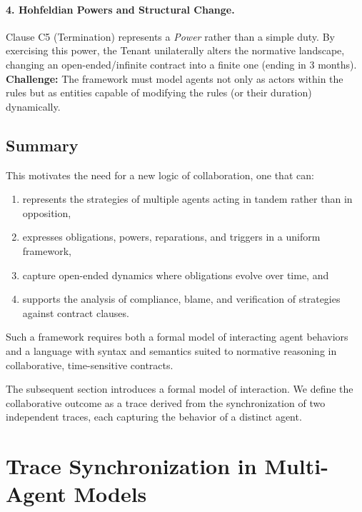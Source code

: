 \documentclass{article}
\begin{document}
    \paragraph{4. Hohfeldian Powers and Structural Change.}
    Clause C5 (Termination) represents a \emph{Power} rather than a simple duty.
    By exercising this power, the Tenant unilaterally alters the normative landscape, changing an open-ended/infinite contract into a finite one (ending in 3 months).
    \textbf{Challenge:} The framework must model agents not only as actors within the rules but as entities capable of modifying the rules (or their duration) dynamically.
    \subsection*{Summary}
    This motivates the need for a new logic of collaboration, one that can:
    \begin{enumerate}
    \item represents the strategies of multiple agents acting in tandem rather than in opposition,
    \item expresses obligations, powers, reparations, and triggers in a uniform framework,
    \item capture open-ended dynamics where obligations evolve over time, and
    \item supports the analysis of compliance, blame, and verification of strategies against contract clauses.
    \end{enumerate}
    Such a framework requires both a formal model of interacting agent behaviors and a language with syntax and semantics suited to normative reasoning in collaborative, time-sensitive contracts.
  
  
  
  The subsequent section introduces a formal model of interaction. We define the collaborative outcome as a trace derived from the synchronization of two independent traces, each capturing the behavior of a distinct agent.
  
  \section{Trace Synchronization in Multi-Agent Models}
  \label{sec:multiagent-sync}
  
\end{document}
